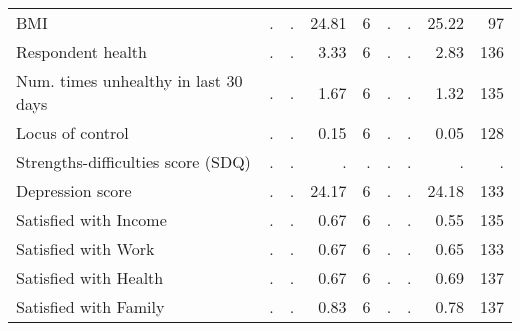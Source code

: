 \begin{tabular}{l r r r r r r r r}
BMI &         . & . &     24.81 &         6 &         . & . &     25.22 &        97 \\
Respondent health &         . & . &      3.33 &         6 &         . & . &      2.83 &       136 \\
Num. times unhealthy in last 30 days &         . & . &      1.67 &         6 &         . & . &      1.32 &       135 \\
Locus of control &         . & . &      0.15 &         6 &         . & . &      0.05 &       128 \\
Strengths-difficulties score (SDQ) &         . & . &         . & . &         . & . &         . & . \\
Depression score &         . & . &     24.17 &         6 &         . & . &     24.18 &       133 \\
Satisfied with Income &         . & . &      0.67 &         6 &         . & . &      0.55 &       135 \\
Satisfied with Work &         . & . &      0.67 &         6 &         . & . &      0.65 &       133 \\
Satisfied with Health &         . & . &      0.67 &         6 &         . & . &      0.69 &       137 \\
Satisfied with Family &         . & . &      0.83 &         6 &         . & . &      0.78 &       137 \\
\bottomrule
\end{tabular}
